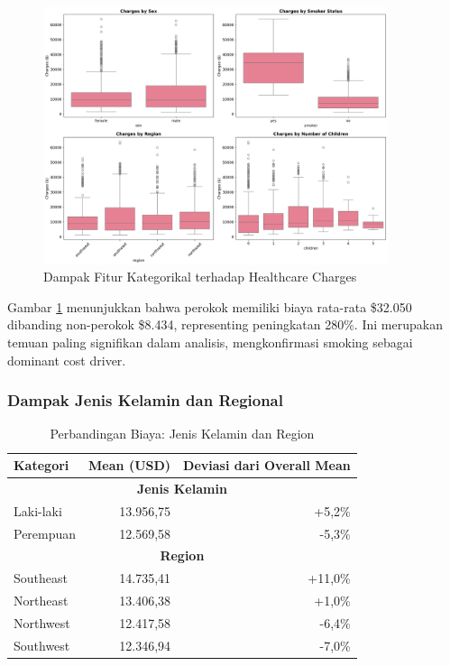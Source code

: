 \begin{figure}[H]
\centering
\includegraphics[width=0.9\textwidth]{../results/plots/05_feature_impact.png}
\caption{Dampak Fitur Kategorikal terhadap Healthcare Charges}
\label{fig:feature-impact}
\end{figure}

Gambar \ref{fig:feature-impact} menunjukkan bahwa perokok memiliki biaya rata-rata \$32.050 dibanding non-perokok \$8.434, representing peningkatan 280\%. Ini merupakan temuan paling signifikan dalam analisis, mengkonfirmasi smoking sebagai dominant cost driver.

\subsubsection{Dampak Jenis Kelamin dan Regional}

\begin{table}[H]
\centering
\caption{Perbandingan Biaya: Jenis Kelamin dan Region}
\label{tab:gender-region-impact}
\begin{tabular}{|l|r|r|}
\hline
\textbf{Kategori} & \textbf{Mean (USD)} & \textbf{Deviasi dari Overall Mean} \\
\hline
\multicolumn{3}{|c|}{\textbf{Jenis Kelamin}} \\
\hline
Laki-laki & 13.956,75 & +5,2\% \\
Perempuan & 12.569,58 & -5,3\% \\
\hline
\multicolumn{3}{|c|}{\textbf{Region}} \\
\hline
Southeast & 14.735,41 & +11,0\% \\
Northeast & 13.406,38 & +1,0\% \\
Northwest & 12.417,58 & -6,4\% \\
Southwest & 12.346,94 & -7,0\% \\
\hline
\end{tabular}
\end{table}

